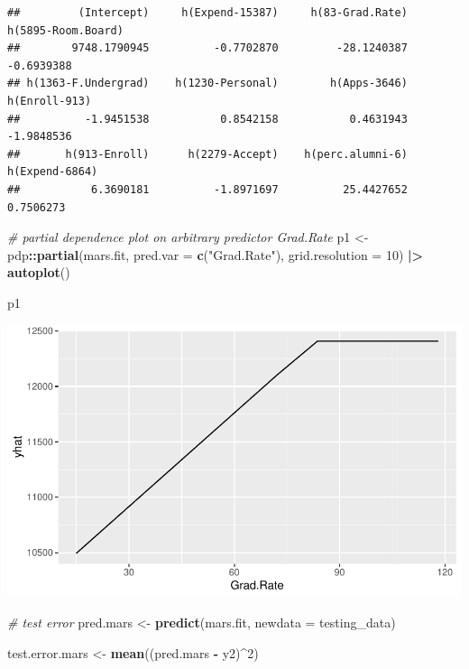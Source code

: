 \documentclass[
]{article}
\newenvironment{Shaded}{\begin{snugshade}}{\end{snugshade}}
\newcommand{\AttributeTok}[1]{\textcolor[rgb]{0.13,0.29,0.53}{#1}}
\newcommand{\CommentTok}[1]{\textcolor[rgb]{0.56,0.35,0.01}{\textit{#1}}}
\newcommand{\DecValTok}[1]{\textcolor[rgb]{0.00,0.00,0.81}{#1}}
\newcommand{\FunctionTok}[1]{\textcolor[rgb]{0.13,0.29,0.53}{\textbf{#1}}}
\newcommand{\NormalTok}[1]{#1}
\newcommand{\OtherTok}[1]{\textcolor[rgb]{0.56,0.35,0.01}{#1}}
\newcommand{\SpecialCharTok}[1]{\textcolor[rgb]{0.81,0.36,0.00}{\textbf{#1}}}
\newcommand{\StringTok}[1]{\textcolor[rgb]{0.31,0.60,0.02}{#1}}
\begin{document}
\begin{verbatim}
##         (Intercept)     h(Expend-15387)     h(83-Grad.Rate)  h(5895-Room.Board) 
##        9748.1790945          -0.7702870         -28.1240387          -0.6939388 
## h(1363-F.Undergrad)    h(1230-Personal)        h(Apps-3646)       h(Enroll-913) 
##          -1.9451538           0.8542158           0.4631943          -1.9848536 
##       h(913-Enroll)      h(2279-Accept)    h(perc.alumni-6)      h(Expend-6864) 
##           6.3690181          -1.8971697          25.4427652           0.7506273
\end{verbatim}

\begin{Shaded}
\begin{Highlighting}[]
\CommentTok{\# partial dependence plot on arbitrary predictor Grad.Rate}
\NormalTok{p1 }\OtherTok{\textless{}{-}}\NormalTok{ pdp}\SpecialCharTok{::}\FunctionTok{partial}\NormalTok{(mars.fit, }\AttributeTok{pred.var =} \FunctionTok{c}\NormalTok{(}\StringTok{"Grad.Rate"}\NormalTok{), }\AttributeTok{grid.resolution =} \DecValTok{10}\NormalTok{) }\SpecialCharTok{|\textgreater{}}
  \FunctionTok{autoplot}\NormalTok{()}

\NormalTok{p1}
\end{Highlighting}
\end{Shaded}

\includegraphics[width=0.9\linewidth]{HW2_co2554_files/figure-latex/MARS-2}

\begin{Shaded}
\begin{Highlighting}[]
\CommentTok{\# test error}
\NormalTok{pred.mars }\OtherTok{\textless{}{-}} \FunctionTok{predict}\NormalTok{(mars.fit, }\AttributeTok{newdata =}\NormalTok{ testing\_data)}

\NormalTok{test.error.mars }\OtherTok{\textless{}{-}} \FunctionTok{mean}\NormalTok{((pred.mars }\SpecialCharTok{{-}}\NormalTok{ y2)}\SpecialCharTok{\^{}}\DecValTok{2}\NormalTok{)}
\end{Highlighting}
\end{Shaded}
\end{document}
